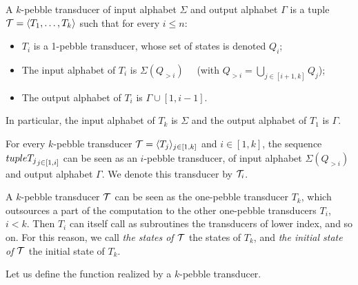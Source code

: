 \begin{definition}%
  A $k$-pebble transducer of input alphabet $\Sigma$ and output alphabet $\Gamma$ is a tuple ${\mathcal T}=\langle T_1,\dots,T_{k} \rangle$ such that for every $i\leq n$:
  \begin{itemize}
  \item  $T_i$ is a 1-pebble transducer, whose set of states is denoted $Q_i$;
  \item  The input alphabet of $T_i$ is $\Sigma(Q_{>i})\quad$ (with $Q_{>i}=\bigcup_{j\in [i+1,k]}Q_j$);
  \item  The output alphabet of $T_i$ is $\Gamma \cup [1,i-1]$.
  \end{itemize} 
  In particular, the input alphabet of $T_k$ is $\Sigma$ and the output alphabet of $T_1$ is $\Gamma$.%
  \end{definition}


For every $k$-pebble transducer ${\mathcal T}=\langle T_j \rangle_{j\in[1,k]}$ and $i\in[1,k]$,  the sequence $\\tuple{T_j}_{j\in[1,i]}$ can be seen as an $i$-pebble transducer, of input alphabet $\Sigma(Q_{>i})$ and output alphabet $\Gamma$. We denote this transducer by ${\mathcal T}_i$.
 
 \medskip
\begin{terminology} 
 A $k$-pebble transducer ${\mathcal T}$ can be seen as the one-pebble transducer $T_k$, which outsources a part of the computation to the other one-pebble transducers $T_i$, $i<k$. Then $T_i$ can itself call as subroutines the transducers of lower index, and so on.
 For this reason, we call \emph{the states of ${\mathcal T}$} the states of $T_k$, and \emph{the initial state of ${\mathcal T}$} the initial state of $T_k$. 
  \end{terminology}
  
  \smallskip
 Let us define the function realized by a $k$-pebble transducer. 
  
